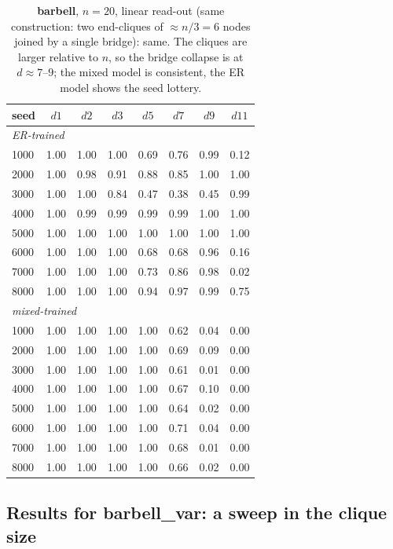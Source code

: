 \documentclass[11pt,a4paper]{article}
\begin{document}
\begin{table}[H]\centering\small
\begin{tabular}{lccccccc}
\toprule
seed & $d1$ & $d2$ & $d3$ & $d5$ & $d7$ & $d9$ & $d11$ \\
\midrule
\multicolumn{8}{l}{\emph{ER-trained}}\\
1000 & 1.00 & 1.00 & 1.00 & 0.69 & 0.76 & 0.99 & 0.12 \\
2000 & 1.00 & 0.98 & 0.91 & 0.88 & 0.85 & 1.00 & 1.00 \\
3000 & 1.00 & 1.00 & 0.84 & 0.47 & 0.38 & 0.45 & 0.99 \\
4000 & 1.00 & 0.99 & 0.99 & 0.99 & 0.99 & 1.00 & 1.00 \\
5000 & 1.00 & 1.00 & 1.00 & 1.00 & 1.00 & 1.00 & 1.00 \\
6000 & 1.00 & 1.00 & 1.00 & 0.68 & 0.68 & 0.96 & 0.16 \\
7000 & 1.00 & 1.00 & 1.00 & 0.73 & 0.86 & 0.98 & 0.02 \\
8000 & 1.00 & 1.00 & 1.00 & 0.94 & 0.97 & 0.99 & 0.75 \\
\midrule
\multicolumn{8}{l}{\emph{mixed-trained}}\\
1000 & 1.00 & 1.00 & 1.00 & 1.00 & 0.62 & 0.04 & 0.00 \\
2000 & 1.00 & 1.00 & 1.00 & 1.00 & 0.69 & 0.09 & 0.00 \\
3000 & 1.00 & 1.00 & 1.00 & 1.00 & 0.61 & 0.01 & 0.00 \\
4000 & 1.00 & 1.00 & 1.00 & 1.00 & 0.67 & 0.10 & 0.00 \\
5000 & 1.00 & 1.00 & 1.00 & 1.00 & 0.64 & 0.02 & 0.00 \\
6000 & 1.00 & 1.00 & 1.00 & 1.00 & 0.71 & 0.04 & 0.00 \\
7000 & 1.00 & 1.00 & 1.00 & 1.00 & 0.68 & 0.01 & 0.00 \\
8000 & 1.00 & 1.00 & 1.00 & 1.00 & 0.66 & 0.02 & 0.00 \\
\bottomrule\end{tabular}
\caption{\textbf{barbell}, $n=20$, linear read-out (same construction: two end-cliques of
$\approx n/3 = 6$ nodes joined by a single bridge): same. The cliques are larger relative to $n$, so the bridge
collapse is at $d\approx7$--$9$; the mixed model is consistent, the ER model shows the seed
lottery.}
\label{tab:bar_n20}
\end{table}

\subsection{Results for barbell\_var: a sweep in the clique size}
\end{document}
